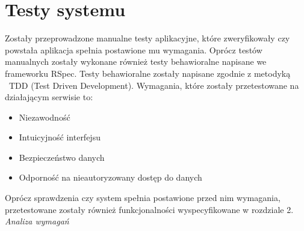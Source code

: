 \chapter{Testy systemu}
\label{cha;testySystemu}

Zostały przeprowadzone manualne testy aplikacyjne, które zweryfikowały czy powstała aplikacja spełnia postawione mu wymagania. Oprócz testów manualnych zostały wykonane również testy behawioralne napisane we frameworku RSpec. Testy behawioralne zostały napisane zgodnie z metodyką  TDD (Test Driven Development). Wymagania, które zostały przetestowane na działającym serwisie to:
\begin{itemize}
\item Niezawodność
\item Intuicyjność interfejsu
\item Bezpieczeństwo danych
\item Odporność na nieautoryzowany dostęp do danych
\end{itemize}
Oprócz sprawdzenia czy system spełnia postawione przed nim wymagania, przetestowane zostały również funkcjonalności wyspecyfikowane w rozdziale 2. \textit{Analiza wymagań}

